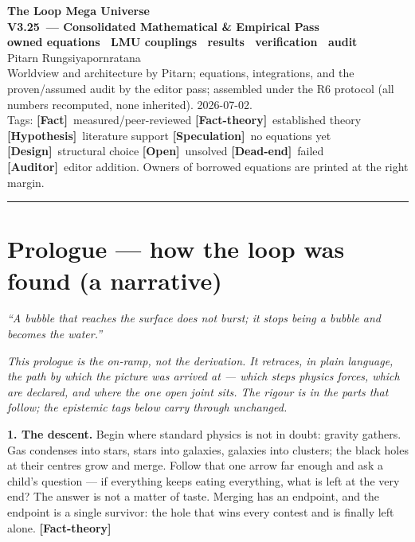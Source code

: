 \documentclass[11pt]{article}
\newcommand{\lmuver}{3.25}
\newcommand{\Fact}{\textbf{\textcolor{green!45!black}{[Fact]}}}
\newcommand{\Hyp}{\textbf{\textcolor{blue!55!black}{[Hypothesis]}}}
\newcommand{\Spec}{\textbf{\textcolor{orange!75!black}{[Speculation]}}}
\newcommand{\Dead}{\textbf{\textcolor{red!65!black}{[Dead-end]}}}
\newcommand{\Design}{\textbf{\textcolor{purple!65!black}{[Design]}}}
\newcommand{\Open}{\textbf{\textcolor{gray!10!black}{[Open]}}}
\newcommand{\Auditor}{\textbf{\textcolor{teal!55!black}{[Auditor]}}}
\newcommand{\factth}{\textcolor{green!40!black}{\textbf{[Fact-theory]}}}
\begin{document}
\begin{center}
{\Huge\bfseries The Loop Mega Universe}\\[4pt]
{\LARGE\bfseries V\lmuver\ --- Consolidated Mathematical \& Empirical Pass}\\[3pt]
{\large\bfseries owned equations \textperiodcentered\ LMU couplings \textperiodcentered\ results \textperiodcentered\ verification \textperiodcentered\ audit}\\[8pt]
{\large Pitarn Rungsiyapornratana}\\[2pt]
{\small Worldview and architecture by Pitarn; equations, integrations, and the proven/assumed audit by the editor pass; assembled under the R6 protocol (all numbers recomputed, none inherited). 2026-07-02.}\\[2pt]
{\small Tags: \Fact\ measured/peer-reviewed \quad \factth\ established theory \quad \Hyp\ literature support \quad \Spec\ no equations yet \quad \Design\ structural choice \quad \Open\ unsolved \quad \Dead\ failed \quad \Auditor\ editor addition. Owners of borrowed equations are printed at the right margin.}
\end{center}
\hrule\vspace{6pt}
\part*{Prologue --- how the loop was found (a narrative)}
\begin{flushright}\small\emph{``A bubble that reaches the surface does not burst; it stops being a bubble and becomes the water.''}\end{flushright}

\noindent\emph{This prologue is the on-ramp, not the derivation. It retraces, in plain language, the path by which the picture was arrived at --- which steps physics forces, which are declared, and where the one open joint sits. The rigour is in the parts that follow; the epistemic tags below carry through unchanged.}

\medskip
\noindent\textbf{1. The descent.} Begin where standard physics is not in doubt: gravity gathers. Gas condenses into stars, stars into galaxies, galaxies into clusters; the black holes at their centres grow and merge. Follow that one arrow far enough and ask a child's question --- if everything keeps eating everything, what is left at the very end? The answer is not a matter of taste. Merging has an endpoint, and the endpoint is a single survivor: the hole that wins every contest and is finally left alone. \factth
\end{document}
